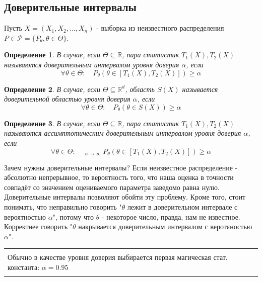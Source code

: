 \documentclass[a4paper,12pt]{article}
\newcommand{\sample}{X_1, X_2, ..., X_n}
\newcommand{\R}{\mathbb{R}}
\DeclareMathOperator*\lowlim{\underline{lim}}
\newenvironment{annotation}{\begin{center}
    \begin{tabular}{|p{0.9\textwidth}|}
    \hline\\
}
{ 
    \\\\\hline
    \end{tabular} 
    \end{center}
}
\newtheorem{dfn}{Определение}[section]
\theoremstyle{named}
\begin{document}
\subsection{Доверительные интервалы}
Пусть $X = (\sample)$ - выборка из неизвестного распределения $P \in \mathcal{P} = \{P_\theta, \theta \in \Theta \}$.
\begin{dfn}
    В случае, если $\Theta \subseteq \R$, пара статистик $T_1(X), T_2(X)$ называются доверительным интервалом уровня 
    доверия $\alpha$, если 
    $$
        \forall \theta \in \Theta: \quad P_\theta(\theta \in [T_1(X), T_2(X)]) \geq \alpha
    $$
\end{dfn}
\begin{dfn}
    В случае, если $\Theta \subseteq \R^d$, область $S(X)$ называется доверительной областью уровня доверия $\alpha$, 
    если 
    $$
        \forall \theta \in \Theta: \quad P_\theta(\theta \in S(X)) \geq \alpha
    $$
\end{dfn}
\begin{dfn}
    В случае, если $\Theta \subseteq \R$, пара статистик $T_1(X), T_2(X)$ называются ассимптотическим 
    доверительным интервалом уровня 
    доверия $\alpha$, если 
    $$
        \forall \theta \in \Theta: \quad \lowlim_{n\to \infty}P_\theta(\theta \in [T_1(X), T_2(X)]) \geq \alpha
    $$
\end{dfn}
Зачем нужны доверительные интервалы? Если неизвестное распределение - абсолютно непрерывное, то вероятность того, что 
наша оценка в точности совпадёт со значением оцениваемого параметра заведомо равна нулю. Доверительные интервалы позволяют 
обойти эту проблему. Кроме того, стоит понимать, что неправильно говорить "$\theta$ лежит в доверительном интервале с вероятностью 
$\alpha$", потому что $\theta$ - некоторое число, правда, нам не известное. Корректнее говорить "$\theta$ накрывается 
доверительным интервалом с веротяностью $\alpha$".
\begin{annotation}
    Обычно в качестве уровня доверия выбирается первая магическая стат. константа: $\alpha = 0.95$
\end{annotation}
\end{document}

